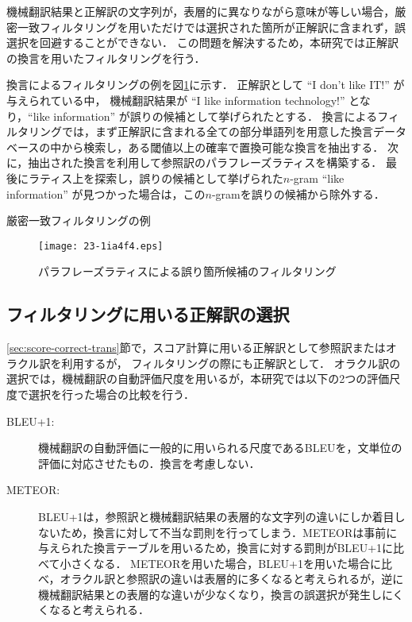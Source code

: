 \documentclass[japanese]{jnlp_1.4}
\newcommand{\textcolor}[2]{}
\begin{document}
機械翻訳結果と正解訳の文字列が，表層的に異なりながら意味が等しい場合，厳密一致フィルタリングを用いただけでは選択された箇所が正解訳に含まれず，誤選択を回避することができない．
この問題を解決するため，本研究では正解訳の換言を用いたフィルタリングを行う．

換言によるフィルタリングの例を図\ref{fig:para-ref}に示す．
正解訳として ``I don't like IT!'' が与えられている中，
機械翻訳結果が ``I like information technology!'' となり，``like information'' が誤りの候補として挙げられたとする．
換言によるフィルタリングでは，まず正解訳に含まれる全ての部分単語列を用意した換言データベースの中から検索し，ある閾値以上の確率で置換可能な換言を抽出する．
次に，抽出された換言を利用して参照訳のパラフレーズラティス\cite{onishi10paraphrase}を構築する．
最後にラティス上を探索し，誤りの候補として挙げられた$n$-gram ``like information'' が見つかった場合は，この$n$-gramを誤りの候補から除外する．

\begin{table}[t]
\setlength{\fboxsep}{0.1em}
\caption{厳密一致フィルタリングの例}
\label{tab:exact-filter}

\end{table}
\begin{figure}[t]
\begin{center}
\texttt{[image: 23-1ia4f4.eps]}
\end{center}
\caption{パラフレーズラティスによる誤り箇所候補のフィルタリング}
\label{fig:para-ref}
\end{figure}


\subsection{フィルタリングに用いる正解訳の選択}

\ref{sec:score-correct-trans}節で，スコア計算に用いる正解訳として参照訳またはオラクル訳を利用するが，
フィルタリングの際にも正解訳として\textcolor{black}{参照訳のみ用いた場合と，参照訳に加えてオラクル訳を用いた場合で比較を行う}．
オラクル訳の選択では，機械翻訳の自動評価尺度を用いるが，本研究では以下の2つの評価尺度で選択を行った場合の比較を行う．

\begin{description}
	\item[BLEU+1:] 機械翻訳の自動評価に一般的に用いられる尺度であるBLEUを，文単位の評価に対応させたもの．換言を考慮しない．
	\item[METEOR:] BLEU+1は，参照訳と機械翻訳結果の表層的な文字列の違いにしか着目しないため，換言に対して不当な罰則を行ってしまう．METEORは事前に与えられた換言テーブルを用いるため，換言に対する罰則がBLEU+1に比べて小さくなる．
	METEORを用いた場合，BLEU+1を用いた場合に比べ，オラクル訳と参照訳の違いは表層的に多くなると考えられるが，逆に機械翻訳結果との表層的な違いが少なくなり，換言の誤選択が発生しにくくなると考えられる．
\end{description}
\end{document}
